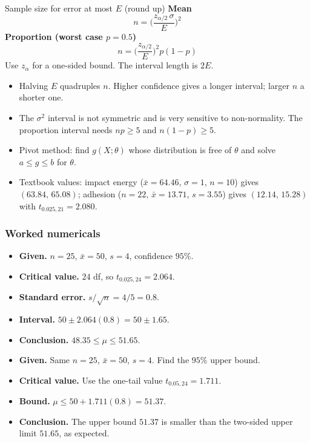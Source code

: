 \begin{formulabox}{Sample size for error at most $E$ (round up)}
\textbf{Mean}
\[ n=\Big(\frac{z_{\alpha/2}\,\sigma}{E}\Big)^2 \]
\textbf{Proportion (worst case $p=0.5$)}
\[ n=\Big(\frac{z_{\alpha/2}}{E}\Big)^2p(1-p) \]
Use $z_\alpha$ for a one-sided bound. The interval length is $2E$.
\end{formulabox}

\begin{notebox}
\begin{itemize}
  \item Halving $E$ quadruples $n$. Higher confidence gives a longer interval; larger $n$ a shorter one.
  \item The $\sigma^2$ interval is not symmetric and is very sensitive to non-normality. The proportion interval needs $np\ge5$ and $n(1-p)\ge5$.
  \item Pivot method: find $g(X;\theta)$ whose distribution is free of $\theta$ and solve $a\le g\le b$ for $\theta$.
  \item Textbook values: impact energy ($\bar{x}=64.46$, $\sigma=1$, $n=10$) gives $(63.84,\,65.08)$; adhesion ($n=22$, $\bar{x}=13.71$, $s=3.55$) gives $(12.14,\,15.28)$ with $t_{0.025,21}=2.080$.
\end{itemize}
\end{notebox}

\subsubsection*{Worked numericals}

\begin{example}
\begin{itemize}
  \item \textbf{Given.} $n=25$, $\bar{x}=50$, $s=4$, confidence $95\%$.
  \item \textbf{Critical value.} $24$ df, so $t_{0.025,24}=2.064$.
  \item \textbf{Standard error.} $s/\sqrt n=4/5=0.8$.
  \item \textbf{Interval.} $50\pm2.064(0.8)=50\pm1.65$.
  \item \textbf{Conclusion.} $48.35\le\mu\le51.65$.
\end{itemize}
\end{example}

\begin{example}
\begin{itemize}
  \item \textbf{Given.} Same $n=25$, $\bar{x}=50$, $s=4$. Find the $95\%$ upper bound.
  \item \textbf{Critical value.} Use the one-tail value $t_{0.05,24}=1.711$.
  \item \textbf{Bound.} $\mu\le50+1.711(0.8)=51.37$.
  \item \textbf{Conclusion.} The upper bound $51.37$ is smaller than the two-sided upper limit $51.65$, as expected.
\end{itemize}
\end{example}

